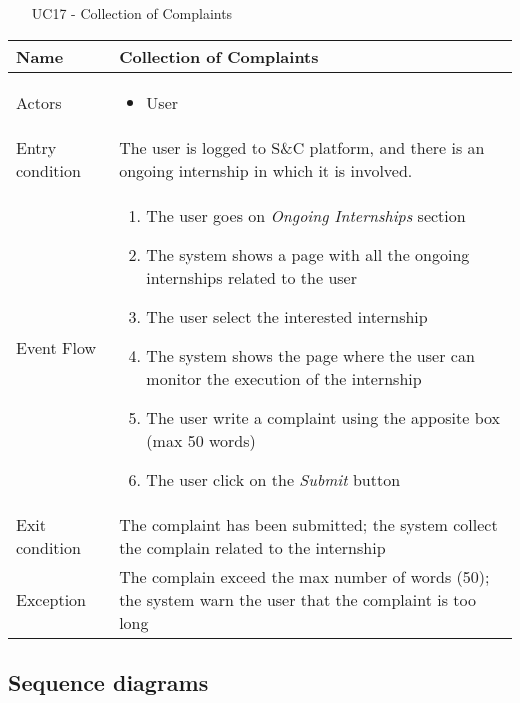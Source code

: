 				
				\begin{table} [H]
					\centering
					\begin{itemize}
						\item [UC17] - Collection of Complaints
					\end{itemize}
					
					\begin{tabular}{|| P{7.5cm} | P{7.5cm} ||}
						\hline
						Name & Collection of Complaints \\
						\hline
						Actors & \parbox{5cm}{\begin{itemize}
								\item User
							\end{itemize}
						} \\
						\hline
						Entry condition & The user is logged to S\&C platform, 
						and there is an ongoing internship in 
						which it is involved.  \\
						\hline
						Event Flow & \parbox{5cm}{\begin{enumerate}
								\item The user goes on \textit{Ongoing 
								Internships} section 
								\item The system shows a page with 
								all the ongoing internships 
								related to the user  
								\item The user select the interested 
								internship  
								\item The system shows the page 
								where the user can monitor the 
								execution of the internship
								\item The user write a complaint 
								using the apposite box (max 50 
								words) 
								\item The user click on the \textit{Submit}
								button
						\end{enumerate}} \\
						\hline 
						Exit condition & The complaint has been submitted; 
						the system collect the complain 
						related to the internship \\
						\hline
						Exception & The complain exceed the max number 
						of words (50); the system warn the 
						user that the complaint is too long \\
						\hline
					\end{tabular}
				\end{table}
				
		\subsection{Sequence diagrams}
		
